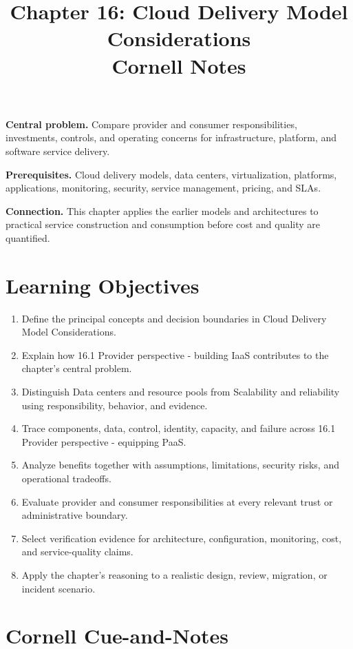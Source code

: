 \documentclass[11pt]{article}
\title{Chapter 16: Cloud Delivery Model Considerations\\[2mm]\large Cornell Notes}
\author{}
\date{}
\begin{document}
\maketitle
\thispagestyle{fancy}
\vspace{-1.5em}
\begin{orientationbox}
\textbf{Central problem.} Compare provider and consumer responsibilities, investments, controls, and operating concerns for infrastructure, platform, and software service delivery.\par\smallskip
\textbf{Prerequisites.} Cloud delivery models, data centers, virtualization, platforms, applications, monitoring, security, service management, pricing, and SLAs.\par\smallskip
\textbf{Connection.} This chapter applies the earlier models and architectures to practical service construction and consumption before cost and quality are quantified.
\end{orientationbox}
\section{Learning Objectives}
\begin{enumerate}
\item Define the principal concepts and decision boundaries in Cloud Delivery Model Considerations.
\item Explain how 16.1 Provider perspective - building IaaS contributes to the chapter's central problem.
\item Distinguish Data centers and resource pools from Scalability and reliability using responsibility, behavior, and evidence.
\item Trace components, data, control, identity, capacity, and failure across 16.1 Provider perspective - equipping PaaS.
\item Analyze benefits together with assumptions, limitations, security risks, and operational tradeoffs.
\item Evaluate provider and consumer responsibilities at every relevant trust or administrative boundary.
\item Select verification evidence for architecture, configuration, monitoring, cost, and service-quality claims.
\item Apply the chapter's reasoning to a realistic design, review, migration, or incident scenario.
\end{enumerate}
\section{Cornell Cue-and-Notes}
\end{document}

